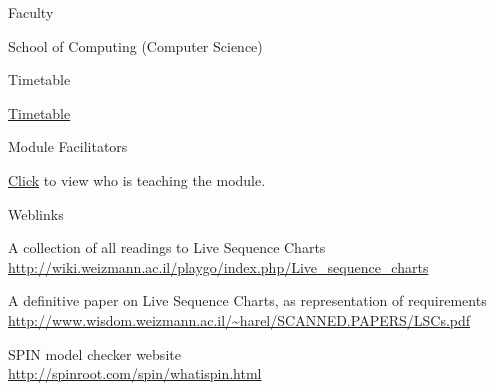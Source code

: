 \protect\hypertarget{ctl00_ctl00_ContentPlaceHolder1_ContentPlaceHolder1_LV_ctrl0_lcFaculty}{}{Faculty}

\protect\hypertarget{ctl00_ctl00_ContentPlaceHolder1_ContentPlaceHolder1_LV_ctrl0_lcFac}{}{School
of Computing (Computer Science)}

\protect\hypertarget{ctl00_ctl00_ContentPlaceHolder1_ContentPlaceHolder1_LV_ctrl0_Label1}{}{Timetable}

\protect\hypertarget{ctl00_ctl00_ContentPlaceHolder1_ContentPlaceHolder1_LV_ctrl0_Span1}{}{\href{javascript:void(0);}{Timetable}}

\protect\hypertarget{ctl00_ctl00_ContentPlaceHolder1_ContentPlaceHolder1_LV_ctrl0_Label6}{}{Module
Facilitators}

\protect\hypertarget{ctl00_ctl00_ContentPlaceHolder1_ContentPlaceHolder1_LV_ctrl0_Span2}{}{\href{list_lecturers.aspx?CourseID=be4ce92a-0e2c-4160-91bb-f26912239937\&ClickFrom=}{Click}
to view who is teaching the module.}

\protect\hypertarget{ctl00_ctl00_ContentPlaceHolder1_ContentPlaceHolder1_LV_ctrl0_LabelCtrl1}{}{Weblinks}

{ }

\protect\hypertarget{ctl00_ctl00_ContentPlaceHolder1_ContentPlaceHolder1_LV_ctrl0_LV_Weblink_ctrl0_lblDesc}{}{A
collection of all readings to Live Sequence Charts}
\href{javascript:__doPostBack('ctl00$ctl00$ContentPlaceHolder1$ContentPlaceHolder1$LV$ctrl0$LV_Weblink$ctrl0$lbView','')}{\\
http://wiki.weizmann.ac.il/playgo/index.php/Live\_sequence\_charts}

\protect\hypertarget{ctl00_ctl00_ContentPlaceHolder1_ContentPlaceHolder1_LV_ctrl0_LV_Weblink_ctrl0_lcWebRatings}{}{}

\protect\hypertarget{ctl00_ctl00_ContentPlaceHolder1_ContentPlaceHolder1_LV_ctrl0_LV_Weblink_ctrl1_lblDesc}{}{A
definitive paper on Live Sequence Charts, as representation of
requirements}
\href{javascript:__doPostBack('ctl00$ctl00$ContentPlaceHolder1$ContentPlaceHolder1$LV$ctrl0$LV_Weblink$ctrl1$lbView','')}{\\
http://www.wisdom.weizmann.ac.il/\textasciitilde{}harel/SCANNED.PAPERS/LSCs.pdf}

\protect\hypertarget{ctl00_ctl00_ContentPlaceHolder1_ContentPlaceHolder1_LV_ctrl0_LV_Weblink_ctrl1_lcWebRatings}{}{}

\protect\hypertarget{ctl00_ctl00_ContentPlaceHolder1_ContentPlaceHolder1_LV_ctrl0_LV_Weblink_ctrl2_lblDesc}{}{SPIN
model checker website}
\href{javascript:__doPostBack('ctl00$ctl00$ContentPlaceHolder1$ContentPlaceHolder1$LV$ctrl0$LV_Weblink$ctrl2$lbView','')}{\\
http://spinroot.com/spin/whatispin.html}

